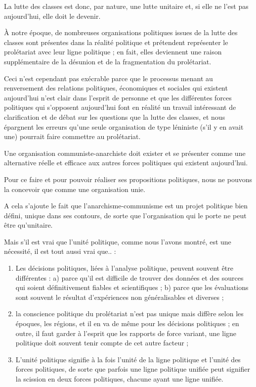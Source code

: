 La lutte des classes est donc, par nature, une lutte unitaire et, si elle ne l'est pas aujourd'hui, elle doit le devenir.

À notre époque, de nombreuses organisations politiques issues de la lutte des classes sont présentes dans la réalité politique et prétendent représenter le prolétariat avec leur ligne politique ; en fait, elles deviennent une raison supplémentaire de la désunion et de la fragmentation du prolétariat.

Ceci n'est cependant pas exécrable parce que le processus menant au renversement des relations politiques, économiques et sociales qui existent aujourd'hui n'est clair dans l'esprit de personne et que les différentes forces politiques qui s'opposent aujourd'hui font en réalité un travail intéressant de clarification et de débat sur les questions que la lutte des classes, et nous épargnent les erreurs qu'une seule organisation de type léniniste (s'il y en avait une) pourrait faire commettre au prolétariat.

Une organisation communiste-anarchiste doit exister et se présenter comme une alternative réelle et efficace aux autres forces politiques qui existent aujourd'hui.

Pour ce faire et pour pouvoir réaliser ses propositions politiques, nous ne pouvons la concevoir que comme une organisation unie.

A cela s'ajoute le fait que l'anarchisme-communisme est un projet politique bien défini, unique dans ses contours, de sorte que l'organisation qui le porte ne peut être qu'unitaire.

Mais s'il est vrai que l'unité politique, comme nous l'avons montré, est une nécessité, il est tout aussi vrai que.. :

\begin{enumerate}
\item{} Les décisions politiques, liées à l'analyse politique, peuvent souvent être différentes : a) parce qu'il est difficile de trouver des données et des sources qui soient définitivement fiables et scientifiques ; b) parce que les évaluations sont souvent le résultat d'expériences non généralisables et diverses ;
\item{} la conscience politique du prolétariat n'est pas unique mais diffère selon les époques, les régions, et il en va de même pour les décisions politiques ; en outre, il faut garder à l'esprit que les rapports de force variant, une ligne politique doit souvent tenir compte de cet autre facteur ;
\item{} L'unité politique signifie à la fois l'unité de la ligne politique et l'unité des forces politiques, de sorte que parfois une ligne politique unifiée peut signifier la scission en deux forces politiques, chacune ayant une ligne unifiée.
\end{enumerate}


